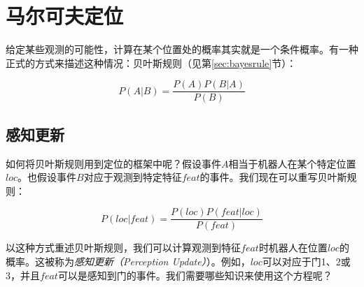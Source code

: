 
\section{马尔可夫定位}
\label{sec:markovloc}
 给定某些观测的可能性，计算在某个位置处的概率其实就是一个条件概率。有一种正式的方式来描述这种情况：贝叶斯规则（见第\ref{sec:bayesrule}节）：

\begin{equation}
P(A|B)=\frac{P(A)P(B|A)}{P(B)}
\end{equation}


\subsection{感知更新}
如何将贝叶斯规则用到定位的框架中呢？假设事件$A$相当于机器人在某个特定位置$loc$。也假设事件$B$对应于观测到特定特征$feat$的事件。我们现在可以重写贝叶斯规则：


\begin{equation}
P(loc|feat)=\frac{P(loc)P(feat|loc)}{P(feat)}
\end{equation}


以这种方式重述贝叶斯规则，我们可以计算观测到特征$feat$时机器人在位置$loc$的概率。这被称为\emph{感知更新（Perception Update）}）。例如，$loc$可以对应于门1、2或3，并且$feat$可以是感知到门的事件。我们需要哪些知识来使用这个方程呢？

